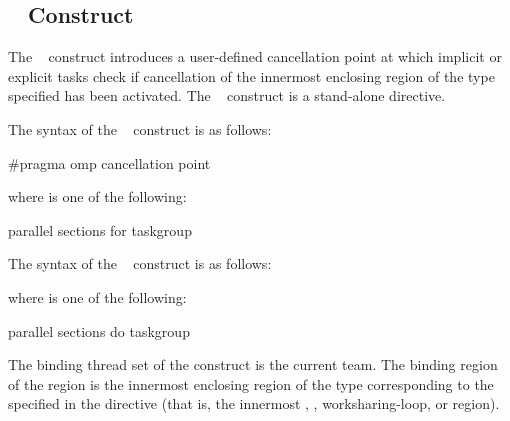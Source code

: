 \subsection{~ Construct}
\label{subsec:cancellation point Construct}
\summary
The ~ construct introduces a user-defined 
cancellation point at which implicit or explicit tasks check if cancellation 
of the innermost enclosing region of the type specified has been activated. 
The ~ construct is a stand-alone directive.

\syntax
\begin{ccppspecific}
The syntax of the ~ construct is as follows:

\begin{ompcPragma}
#pragma omp cancellation point 
\end{ompcPragma}

where  is one of the following:

\begin{indentedcodelist}
parallel
sections
for
taskgroup
\end{indentedcodelist}
\end{ccppspecific}

\begin{fortranspecific}
The syntax of the ~ construct is as follows:


where  is one of the following:

\begin{indentedcodelist}
parallel
sections
do
taskgroup
\end{indentedcodelist}
\end{fortranspecific}

\binding
The binding thread set of the  construct is the current 
team. The binding region of the  region is the innermost 
enclosing region of the type corresponding to the 
specified in the directive (that is, the innermost , , 
worksharing-loop, or  region).

